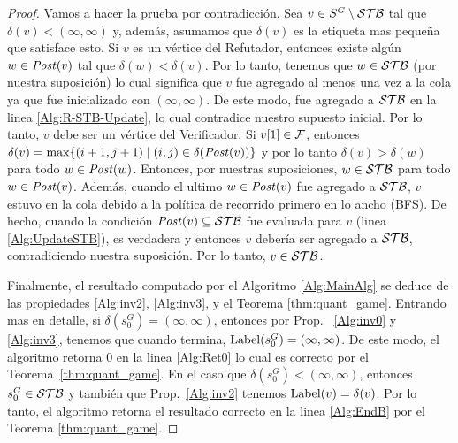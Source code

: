 \begin{proof}
Vamos a hacer la prueba por contradicción. Sea $v \in S^G \setminus \STB$ tal que $\delta(v) < (\infty, \infty)$ y, además, asumamos que
$\delta(v)$ es la etiqueta mas pequeña que satisface esto.
Si $v$ es un vértice del Refutador, entonces existe algún $w \in \post(v)$ tal que $\delta(w) < \delta(v)$. 
Por lo tanto, tenemos que $w \in \STB$ (por nuestra suposición) lo cual significa que $v$ fue agregado al menos una vez a la cola ya que fue inicializado con $(\infty, \infty)$. 
De este modo, fue agregado a $\STB$ en la linea \ref{Alg:R-STB-Update}, lo cual contradice nuestro supuesto inicial. 
Por lo tanto, $v$ debe ser un vértice del Verificador. 
Si $\pr{1}{v} \in \Faults$, entonces $\delta(v) = \max \{(i+1,j+1) \mid (i,j) \in \delta(\post(v))\}$ 
y por lo tanto $\delta(v) > \delta(w)$ para todo $w \in \post(w)$.
Entonces, por nuestras suposiciones, $w \in \STB$ para todo $w \in \post(v)$.
Además, cuando el ultimo $w \in \post(v)$ fue agregado a $\STB$, $v$ estuvo en la cola debido a la política de recorrido primero en lo ancho (BFS).
De hecho, cuando la condición $\post(v) \subseteq \STB$ fue evaluada para $v$ (linea \ref{Alg:UpdateSTB}), es verdadera y entonces $v$ 
debería ser agregado a $\STB$, contradiciendo nuestra suposición. Por lo tanto, $v \in \STB$.

Finalmente, el resultado computado por el Algoritmo \ref{Alg:MainAlg} se deduce de las propiedades \ref{Alg:inv2}, \ref{Alg:inv3}, 
y el Teorema \ref{thm:quant_game}. 
Entrando mas en detalle, si $\delta(s_{0}^G) = (\infty, \infty)$, entonces por Prop. ~\ref{Alg:inv0} y \ref{Alg:inv3}, tenemos que cuando termina, $\Label(s_{0}^G) = (\infty, \infty)$. 
De este modo, el algoritmo retorna $0$ en la linea \ref{Alg:Ret0} lo cual es correcto por el Teorema~\ref{thm:quant_game}. 
En el caso que $\delta(s_0^G)< (\infty, \infty)$, entonces $s_0^G \in \STB$ y también que Prop.~\ref{Alg:inv2} tenemos $\Label(v) = \delta(v)$. Por lo tanto, el algoritmo retorna el resultado correcto en la linea \ref{Alg:EndB} por el Teorema \ref{thm:quant_game}. 
\qedhere
\end{proof}





